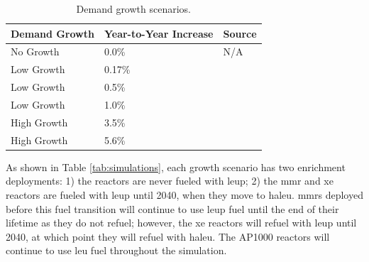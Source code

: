 \begin{table}[H]
    \centering
    \caption{Demand growth scenarios.}
    \label{tab:demand_scenarios}
    \begin{tabular}{l l l}
        \hline
        \textbf{Demand Growth} & \textbf{Year-to-Year Increase} & \textbf{Source}\\
        \hline
        No Growth & 0.0\% & N/A\\
        Low Growth & 0.17\% & \cite{eia_aeo_2023}\\
        Low Growth & 0.5\% & \cite{eia_aeo_2023}\\
        Low Growth & 1.0\% & \cite{eia_aeo_2023}\\
        High Growth & 3.5\% & \cite{julie_liftoff_pathways_2024} \\
        High Growth & 5.6\% & \cite{julie_liftoff_pathways_2024}\\
        \hline
    \end{tabular}
  \end{table}

As shown in Table \ref{tab:simulations}, each growth scenario has two enrichment deployments: 1) the reactors are never fueled with \gls{leup}; 2) the \gls{mmr} and \gls{xe} reactors are fueled with \gls{leup} until 2040, when they move to \gls{haleu}. \glspl{mmr} deployed before this fuel transition will continue to use \gls{leup} fuel until the end of their lifetime as they do not refuel; however, the \gls{xe} reactors will refuel with \gls{leup} until 2040, at which point they will refuel with \gls{haleu}. The AP1000 reactors will continue to use \gls{leu} fuel throughout the simulation.




